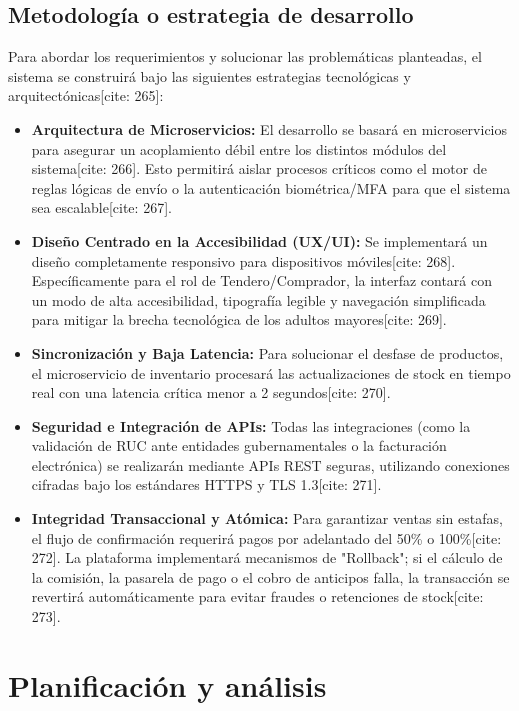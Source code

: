 \documentclass[11pt,a4paper]{report}
\begin{document}
\section{Metodología o estrategia de desarrollo}
Para abordar los requerimientos y solucionar las problemáticas planteadas, el sistema se construirá bajo las siguientes estrategias tecnológicas y arquitectónicas[cite: 265]:
\begin{itemize}[leftmargin=*]
    \item \textbf{Arquitectura de Microservicios:} El desarrollo se basará en microservicios para asegurar un acoplamiento débil entre los distintos módulos del sistema[cite: 266]. Esto permitirá aislar procesos críticos como el motor de reglas lógicas de envío o la autenticación biométrica/MFA para que el sistema sea escalable[cite: 267].
    \item \textbf{Diseño Centrado en la Accesibilidad (UX/UI):} Se implementará un diseño completamente responsivo para dispositivos móviles[cite: 268]. Específicamente para el rol de Tendero/Comprador, la interfaz contará con un modo de alta accesibilidad, tipografía legible y navegación simplificada para mitigar la brecha tecnológica de los adultos mayores[cite: 269].
    \item \textbf{Sincronización y Baja Latencia:} Para solucionar el desfase de productos, el microservicio de inventario procesará las actualizaciones de stock en tiempo real con una latencia crítica menor a 2 segundos[cite: 270].
    \item \textbf{Seguridad e Integración de APIs:} Todas las integraciones (como la validación de RUC ante entidades gubernamentales o la facturación electrónica) se realizarán mediante APIs REST seguras, utilizando conexiones cifradas bajo los estándares HTTPS y TLS 1.3[cite: 271].
    \item \textbf{Integridad Transaccional y Atómica:} Para garantizar ventas sin estafas, el flujo de confirmación requerirá pagos por adelantado del 50\% o 100\%[cite: 272]. La plataforma implementará mecanismos de "Rollback"; si el cálculo de la comisión, la pasarela de pago o el cobro de anticipos falla, la transacción se revertirá automáticamente para evitar fraudes o retenciones de stock[cite: 273].
\end{itemize}

\chapter{Planificación y análisis} %
\end{document}

